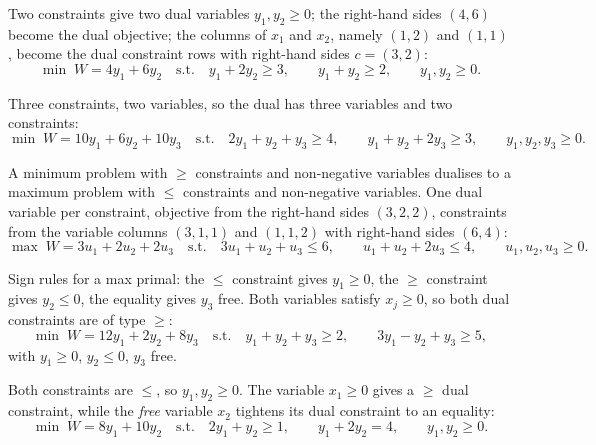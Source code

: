 \begin{solutions}
  \item Two constraints give two dual variables $y_{1},y_{2}\ge 0$; the
        right-hand sides $(4,6)$ become the dual objective; the columns of
        $x_{1}$ and $x_{2}$, namely $(1,2)$ and $(1,1)$, become the dual
        constraint rows with right-hand sides $c=(3,2)$:
        \[
          \min\; W=4y_{1}+6y_{2}
          \quad\text{s.t.}\quad
          y_{1}+2y_{2}\ge 3,\qquad y_{1}+y_{2}\ge 2,\qquad
          y_{1},y_{2}\ge 0 .
        \]

  \item Three constraints, two variables, so the dual has three variables
        and two constraints:
        \[
          \min\; W=10y_{1}+6y_{2}+10y_{3}
          \quad\text{s.t.}\quad
          2y_{1}+y_{2}+y_{3}\ge 4,\qquad
          y_{1}+y_{2}+2y_{3}\ge 3,\qquad
          y_{1},y_{2},y_{3}\ge 0 .
        \]

  \item A minimum problem with $\ge$ constraints and non-negative
        variables dualises to a maximum problem with $\le$ constraints and
        non-negative variables. One dual variable per constraint,
        objective from the right-hand sides $(3,2,2)$, constraints from
        the variable columns $(3,1,1)$ and $(1,1,2)$ with right-hand
        sides $(6,4)$:
        \[
          \max\; W=3u_{1}+2u_{2}+2u_{3}
          \quad\text{s.t.}\quad
          3u_{1}+u_{2}+u_{3}\le 6,\qquad
          u_{1}+u_{2}+2u_{3}\le 4,\qquad
          u_{1},u_{2},u_{3}\ge 0 .
        \]

  \item Sign rules for a max primal: the $\le$ constraint gives
        $y_{1}\ge 0$, the $\ge$ constraint gives $y_{2}\le 0$, the
        equality gives $y_{3}$ free. Both variables satisfy
        $x_{j}\ge 0$, so both dual constraints are of type $\ge$:
        \[
          \min\; W=12y_{1}+2y_{2}+8y_{3}
          \quad\text{s.t.}\quad
          y_{1}+y_{2}+y_{3}\ge 2,\qquad
          3y_{1}-y_{2}+y_{3}\ge 5,
        \]
        with $y_{1}\ge 0$, $y_{2}\le 0$, $y_{3}$ free.

  \item Both constraints are $\le$, so $y_{1},y_{2}\ge 0$. The variable
        $x_{1}\ge 0$ gives a $\ge$ dual constraint, while the \emph{free}
        variable $x_{2}$ tightens its dual constraint to an equality:
        \[
          \min\; W=8y_{1}+10y_{2}
          \quad\text{s.t.}\quad
          2y_{1}+y_{2}\ge 1,\qquad
          y_{1}+2y_{2}= 4,\qquad
          y_{1},y_{2}\ge 0 .
        \]


\end{solutions}
